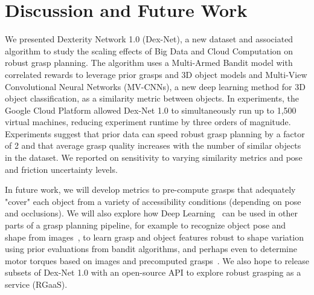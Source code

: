 \section{Discussion and Future Work}
We presented Dexterity Network 1.0 (Dex-Net), a new dataset and associated algorithm to study the scaling effects of Big Data and Cloud Computation on robust grasp planning.
The algorithm uses a Multi-Armed Bandit model with correlated rewards to leverage prior grasps and 3D object models and Multi-View Convolutional Neural Networks (MV-CNNs), a new deep learning method for 3D object classification, as a similarity metric between objects.
In experiments, the Google Cloud Platform allowed Dex-Net 1.0 to simultaneously run up to 1,500 virtual machines, reducing experiment runtime by three orders of magnitude.
Experiments suggest that prior data can speed robust grasp planning by a factor of 2 and that average grasp quality increases with the number of similar objects in the dataset.
We reported on sensitivity to varying similarity metrics and pose and friction uncertainty levels.

In future work, we will develop metrics to pre-compute grasps that adequately "cover" each object from a variety of accessibility conditions (depending on pose and occlusions).
We will also explore how Deep Learning~\cite{krizhevsky2012imagenet} can be used in other parts of a grasp planning pipeline, for example to recognize object pose and shape from images~\cite{aubry2015understanding}, to learn grasp and object features robust to shape variation using prior evaluations from bandit algorithms, and perhaps even to determine motor torques based on images and precomputed grasps~\cite{levine2015end}.
We also hope to release subsets of Dex-Net 1.0 with an open-source API to explore robust grasping as a service (RGaaS).


